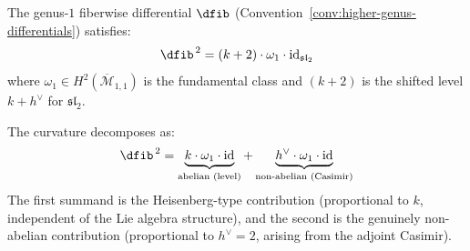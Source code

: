 \begin{theorem}
\label{thm:sl2-genus1-curvature}
The genus-$1$ fiberwise differential
$\dfib$ \textup{(}Convention~\textup{\ref{conv:higher-genus-differentials})} satisfies:
\begin{equation}\label{eq:sl2-genus1-dsquared}
\dfib^{\,2} = (k+2) \cdot \omega_1 \cdot \operatorname{id}_{\mathfrak{sl}_2}
\end{equation}
where $\omega_1 \in H^2(\overline{\mathcal{M}}_{1,1})$ is the fundamental class and $(k+2)$ is the shifted level $k + h^\vee$ for $\mathfrak{sl}_2$.

The curvature decomposes as:
\begin{equation}\label{eq:curvature-decomposition}
\dfib^{\,2} = \underbrace{k \cdot \omega_1 \cdot \operatorname{id}}_{\text{abelian (level)}} + \underbrace{h^\vee \cdot \omega_1 \cdot \operatorname{id}}_{\text{non-abelian (Casimir)}}
\end{equation}
The first summand is the Heisenberg-type contribution (proportional to $k$, independent of the Lie algebra structure), and the second is the genuinely non-abelian contribution (proportional to $h^\vee=2$, arising from the adjoint Casimir).
\end{theorem}

